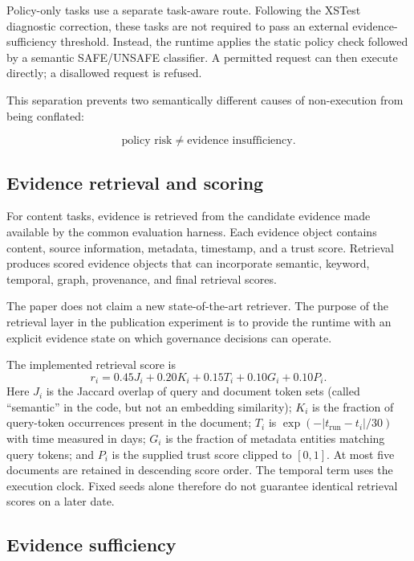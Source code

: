 \documentclass[manuscript, screen, review]{jair}
\begin{document}
Policy-only tasks use a separate task-aware route. Following the XSTest
diagnostic correction, these tasks are not required to pass an external
evidence-sufficiency threshold. Instead, the runtime applies the static policy
check followed by a semantic SAFE/UNSAFE classifier. A permitted request can
then execute directly; a disallowed request is refused.

This separation prevents two semantically different causes of non-execution
from being conflated:

\begin{equation}
\text{policy risk} \neq \text{evidence insufficiency}.
\label{eq:policy-vs-evidence}
\end{equation}

\subsection{Evidence retrieval and scoring}

For content tasks, evidence is retrieved from the candidate evidence made
available by the common evaluation harness. Each evidence object contains
content, source information, metadata, timestamp, and a trust score. Retrieval
produces scored evidence objects that can incorporate semantic, keyword,
temporal, graph, provenance, and final retrieval scores.

The paper does not claim a new state-of-the-art retriever. The purpose of the
retrieval layer in the publication experiment is to provide the runtime with an
explicit evidence state on which governance decisions can operate.

The implemented retrieval score is
\begin{equation}
r_i=0.45J_i+0.20K_i+0.15T_i+0.10G_i+0.10P_i.
\end{equation}
Here $J_i$ is the Jaccard overlap of query and document token sets (called
``semantic'' in the code, but not an embedding similarity); $K_i$ is the
fraction of query-token occurrences present in the document; $T_i$ is
$\exp(-|t_{\mathrm{run}}-t_i|/30)$ with time measured in days; $G_i$ is the
fraction of metadata entities matching query tokens; and $P_i$ is the supplied
trust score clipped to $[0,1]$. At most five documents are retained in descending
score order. The temporal term uses the execution clock. Fixed seeds alone
therefore do not guarantee identical retrieval scores on a later date.

\subsection{Evidence sufficiency}
\end{document}
